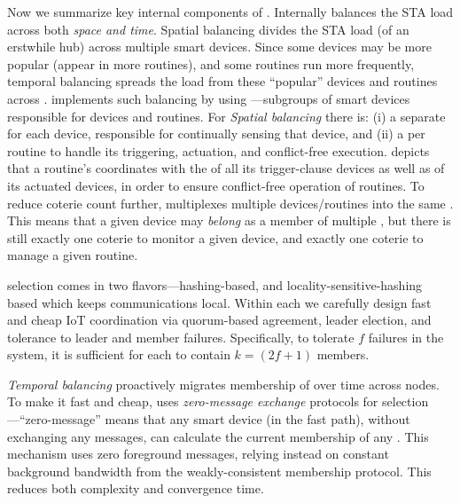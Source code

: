 Now we summarize key internal components of \sysname. 
Internally \sysname{} balances the STA load across both {\it space and time}. 
Spatial balancing divides the STA load (of an erstwhile hub) across multiple smart devices. Since some devices may be more popular (appear in more routines), and some routines run more frequently, temporal balancing spreads the load from these ``popular'' devices and routines across \smarts. 
\sysname{}  implements such balancing by using {\it \kgroups}---subgroups of smart devices responsible for devices
and routines. For {\it Spatial balancing} there is: (i) a separate \kgroup{} for each device, responsible for continually sensing that device,
and (ii) a \kgroup{} per routine to handle its triggering, actuation, and conflict-free execution.  depicts that a routine's \kgroup{} coordinates with the \kgroups{} of all its trigger-clause devices as well as \kgroups{} of its actuated devices, in order to ensure conflict-free operation of routines.  To reduce coterie count further, \sysname{} multiplexes multiple devices/routines into the same \kgroup. {This means that a given device may {\it belong} as a member of multiple \kgroups{}, but there is still exactly one coterie to monitor a given device, and exactly one coterie to manage a given routine.}

\Kgroup{} selection comes in two flavors---hashing-based,  and locality-sensitive-hashing based which keeps \kgroup{} communications local. Within each \kgroup{} we carefully design fast and cheap IoT coordination via quorum-based agreement, leader election, and tolerance to \kgroup{} leader and member failures. Specifically, to tolerate $f$ failures in the system, it is sufficient for each \kgroup{} to contain ${k=}(2f+1)$ members. 


{\it Temporal balancing} proactively migrates   membership of \kgroups{} over time across nodes. To make it fast and cheap, \sysname{} uses {\it zero-message exchange} protocols for
selection---``zero-message'' means that any smart device (in the fast path), without exchanging any messages, can calculate the current membership of any \kgroup{}.
This mechanism uses zero foreground messages, relying instead on constant background bandwidth from the weakly-consistent membership protocol. This reduces both complexity and convergence time.

